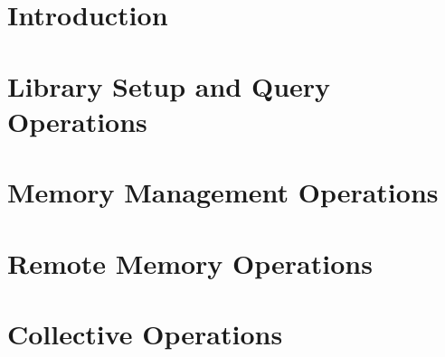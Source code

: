 \documentclass[10pt]{book}
\begin{document}
\hypersetup{pageanchor=true,citecolor=blue}

\pagestyle{fancy}
\fancyhead{}
\fancyhead[LE,LO]{\insertDocVersion}
\fancyfoot[CE,CO]{\thepage}



\setcounter{tocdepth}{2}
\tableofcontents

\mainmatter  %
\pagestyle{headings}  \withlinenumbers

\startchap
\section*{Introduction}
%

%






\startchap
\section*{Library Setup and Query Operations}%
\startchap
\section*{Memory Management Operations}
\startchap
\section*{Remote Memory Operations}
\startchap
\section*{Collective Operations}
\startchap
\end{document}
